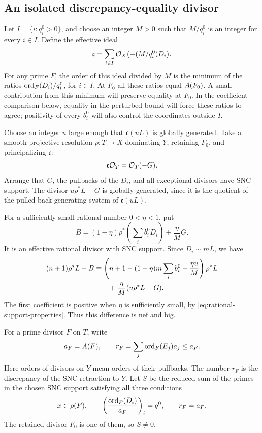 \subsection{An isolated discrepancy-equality divisor}

Let \(I=\{i:q_i^0>0\}\), and choose an integer \(M>0\) such that
\(M/q_i^0\) is an integer for every \(i\in I\).  Define the effective
ideal
\begin{equation}
 \mathfrak c=
 \sum_{i\in I}\mathcal O_X\bigl(-(M/q_i^0)D_i\bigr).
 \label{eq:isolating-ideal}
\end{equation}
For any prime $F$, the order of this ideal divided by $M$ is the
minimum of the ratios $\operatorname{ord}_F(D_i)/q_i^0$, for $i\in I$.
At $F_0$ all these ratios equal $A(F_0)$. A small contribution from
this minimum will preserve equality at $F_0$. In the coefficient
comparison below, equality in the perturbed bound will force these
ratios to agree; positivity of every $b_i^0$ will also control the
coordinates outside $I$.

Choose an integer \(u\) large enough that \(\mathfrak c(uL)\) is
globally generated.  Take a smooth projective resolution
\(\rho:T\to X\) dominating \(Y\), retaining \(F_0\), and
principalizing \(\mathfrak c\):
\[
 \mathfrak c\mathcal O_T=\mathcal O_T(-G).
\]
Arrange that \(G\), the pullbacks of the \(D_i\), and all exceptional
divisors have SNC support.  The divisor \(u\rho^*L-G\) is globally
generated, since it is the quotient of the pulled-back generating
system of \(\mathfrak c(uL)\).

For a sufficiently small rational number \(0<\eta<1\), put
\begin{equation}
 B=(1-\eta)\rho^*\left(\sum_i b_i^0D_i\right)
       +\frac{\eta}{M}G.
 \label{eq:perturbed-boundary}
\end{equation}
It is an effective rational divisor with SNC support.  Since
\(D_i\sim mL\), we have
\begin{align}
 (n+1)\rho^*L-B
 &\equiv
 \left(n+1-(1-\eta)m\sum_i b_i^0-\frac{\eta u}{M}\right)\rho^*L
 \notag\\
 &\hspace{2em}+\frac{\eta}{M}(u\rho^*L-G).
 \label{eq:boundary-nef-big}
\end{align}
The first coefficient is positive when \(\eta\) is sufficiently
small, by \eqref{eq:rational-support-properties}.  Thus this
difference is nef and big.

For a prime divisor \(F\) on \(T\), write
\[
 a_F=A(F),\qquad
 r_F=\sum_j\operatorname{ord}_F(E_j)a_j\leq a_F.
\]
Here orders of divisors on \(Y\) mean orders of their pullbacks.
The number \(r_F\) is the discrepancy of the SNC retraction to
\(Y\).  Let \(S\) be the reduced sum of the primes in the chosen SNC
support satisfying all three conditions
\begin{equation}
 x\in\rho(F),\qquad
 \left(\frac{\operatorname{ord}_F(D_i)}{a_F}\right)_i=q^0,
 \qquad r_F=a_F.
 \label{eq:equality-divisor-definition}
\end{equation}
The retained divisor \(F_0\) is one of them, so \(S\ne0\).

